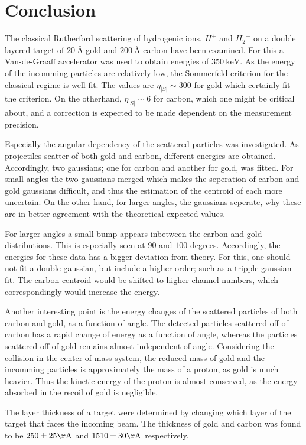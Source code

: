 \section{Conclusion}
The classical Rutherford scattering of hydrogenic ions, $H^+$ and ${H_2}^+$ on
a double layered target of $\SI{20}{\angstrom}$ gold and $\SI{200}{\angstrom}$
carbon have been examined.
For this a Van-de-Graaff accelerator was used to obtain energies of
$\SI{350}{\kilo\electronvolt}$. As the energy of the incomming particles are
relatively low, the Sommerfeld criterion for the classical regime is well fit.
The values are $\eta_|S| \sim 300$ for gold which certainly fit the criterion.
On the otherhand, $\eta_|S| \sim 6$ for carbon, which one might be critical
about, and a correction is expected to be made dependent on the measurement
precision.

Especially the angular dependency of the scattered particles was investigated.
As projectiles scatter of both gold and carbon, different energies are
obtained. Accordingly, two gaussians; one for carbon and another for gold, was
fitted. For small angles the two gaussians merged which makes the seperation of
carbon and gold gaussians difficult, and thus the estimation of the centroid of
each more uncertain. On the other hand, for larger angles, the gaussians
seperate, why these are in better agreement with the theoretical expected
values.

For larger angles a small bump appears inbetween the carbon and gold
distributions. This is especially seen at $90$ and $100$ degrees. Accordingly,
the energies for these data has a bigger deviation from theory. For this, one
should not fit a double gaussian, but include a higher order; such as a tripple
gaussian fit. The carbon centroid would be shifted to higher channel numbers,
which correspondingly would increase the energy. 

Another interesting point is the energy changes of the scattered particles of
both carbon and gold, as a function of angle. The detected particles scattered
off of carbon has a rapid change of energy as a function of angle, whereas the
particles scattered off of gold remains almost independent of angle.
Considering the collision in the center of mass system, the reduced mass of
gold and the incomming particles is approximately the mass of a proton, as gold
is much heavier. Thus the kinetic energy of the proton is almost conserved, as
the energy absorbed in the recoil of gold is negligible. 

The layer thickness of a target were determined by changing which layer of the target that faces the incoming beam. The thickness of gold and carbon was found to be $250\pm25\si{\AA}$ and $1510\pm30\si{\AA}$ respectively. 

\vfill

